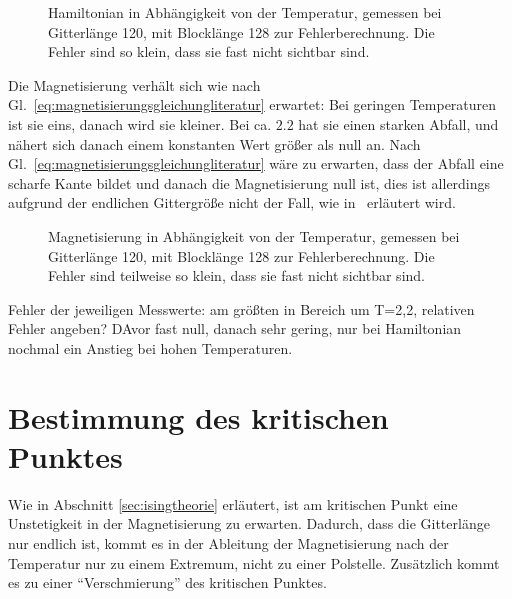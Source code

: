 	
	
	
	\begin{figure}[htbp]
		
		\caption[Hamiltonian in Abhängigkeit von der Temperatur]{Hamiltonian in Abhängigkeit von der Temperatur, gemessen bei Gitterlänge 120, mit Blocklänge 128 zur Fehlerberechnung. Die Fehler sind so klein, dass sie fast nicht sichtbar sind.}
		\label{fig:ergebnishamiltonian}
	\end{figure}
	

	Die Magnetisierung verhält sich wie nach Gl.~\ref{eq:magnetisierungsgleichungliteratur} erwartet: Bei geringen Temperaturen ist sie eins, danach wird sie kleiner. Bei ca. $\num{2,2}$ hat sie einen starken Abfall, und nähert sich danach einem konstanten Wert größer als null an. Nach Gl.~\ref{eq:magnetisierungsgleichungliteratur} wäre zu erwarten, dass der Abfall eine scharfe Kante bildet und danach die Magnetisierung null ist, dies ist allerdings aufgrund der endlichen Gittergröße nicht der Fall, wie in~\cite[S. 45 f.]{binderheermann} erläutert wird.
	

	
	\begin{figure}[htbp]
		
		\caption[Magnetisierung in Abhängigkeit von der Temperatur]{Magnetisierung in Abhängigkeit von der Temperatur, gemessen bei Gitterlänge 120, mit Blocklänge 128 zur Fehlerberechnung. Die Fehler sind teilweise so klein, dass sie fast nicht sichtbar sind.}
		\label{fig:ergebnismagnetisierung}
	\end{figure}
	
	Fehler der jeweiligen Messwerte: am größten in Bereich um T=2,2, relativen Fehler angeben? DAvor fast null, danach sehr gering, nur bei Hamiltonian nochmal ein Anstieg bei hohen Temperaturen.
	
	\section{Bestimmung des kritischen Punktes}
	\label{sec:bestkritpunkt}
	
	Wie in Abschnitt \ref{sec:isingtheorie} erläutert, ist am kritischen Punkt eine Unstetigkeit in der Magnetisierung zu erwarten. Dadurch, dass die Gitterlänge nur endlich ist, kommt es in der Ableitung der Magnetisierung nach der Temperatur nur zu einem Extremum, nicht zu einer Polstelle. Zusätzlich kommt es zu einer \enquote{Verschmierung} des kritischen Punktes\cite[vgl. ][S. 104]{binderheermann}.
	
